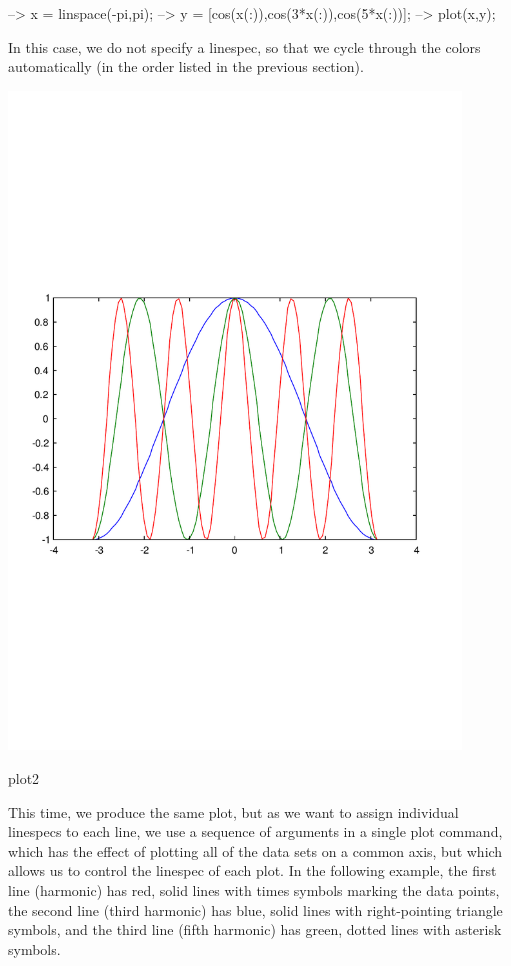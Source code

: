 \begin{DoxyVerbInclude}
--> x = linspace(-pi,pi);
--> y = [cos(x(:)),cos(3*x(:)),cos(5*x(:))];
--> plot(x,y);
\end{DoxyVerbInclude}


In this case, we do not specify a {\ttfamily linespec}, so that we cycle through the colors automatically (in the order listed in the previous section).  
\begin{DoxyImage}
\includegraphics[width=12cm]{plot2}
\caption{plot2}
\end{DoxyImage}


This time, we produce the same plot, but as we want to assign individual {\ttfamily linespec}s to each line, we use a sequence of arguments in a single plot command, which has the effect of plotting all of the data sets on a common axis, but which allows us to control the {\ttfamily linespec} of each plot. In the following example, the first line (harmonic) has red, solid lines with times symbols marking the data points, the second line (third harmonic) has blue, solid lines with right-\/pointing triangle symbols, and the third line (fifth harmonic) has green, dotted lines with asterisk symbols.


